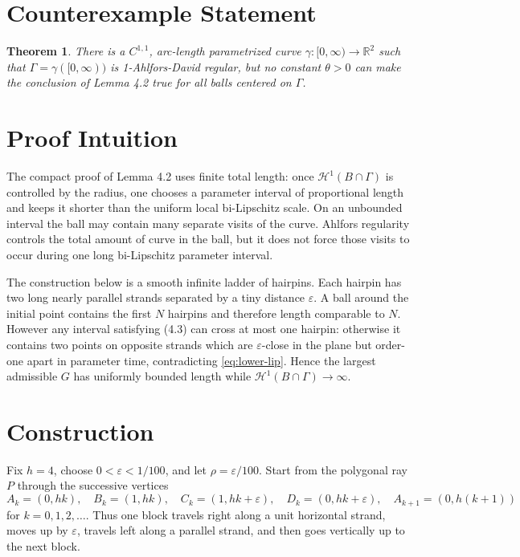 \documentclass[11pt]{article}
\newtheorem{theorem}{Theorem}
\newcommand{\HH}{\mathcal H}
\newcommand{\R}{\mathbb R}
\begin{document}
\section*{Counterexample Statement}

\begin{theorem}
There is a \(C^{1,1}\), arc-length parametrized curve
\(\gamma:[0,\infty)\to\R^2\) such that \(\Gamma=\gamma([0,\infty))\) is
1-Ahlfors-David regular, but no constant \(\theta>0\) can make the conclusion
of Lemma 4.2 true for all balls centered on \(\Gamma\).
\end{theorem}

\section*{Proof Intuition}

The compact proof of Lemma 4.2 uses finite total length: once
\(\HH^1(B\cap\Gamma)\) is controlled by the radius, one chooses a parameter
interval of proportional length and keeps it shorter than the uniform local
bi-Lipschitz scale.  On an unbounded interval the ball may contain many
separate visits of the curve.  Ahlfors regularity controls the total amount of
curve in the ball, but it does not force those visits to occur during one long
bi-Lipschitz parameter interval.

The construction below is a smooth infinite ladder of hairpins.  Each hairpin
has two long nearly parallel strands separated by a tiny distance
\(\varepsilon\).  A ball around the initial point contains the first \(N\)
hairpins and therefore length comparable to \(N\).  However any interval
satisfying (4.3) can cross at most one hairpin: otherwise it contains two
points on opposite strands which are \(\varepsilon\)-close in the plane but
order-one apart in parameter time, contradicting \eqref{eq:lower-lip}.  Hence
the largest admissible \(G\) has uniformly bounded length while
\(\HH^1(B\cap\Gamma)\to\infty\).

\section*{Construction}

Fix \(h=4\), choose \(0<\varepsilon<1/100\), and let
\(\rho=\varepsilon/100\).  Start from the polygonal ray \(P\) through the
successive vertices
\[
  A_k=(0,hk),\quad
  B_k=(1,hk),\quad
  C_k=(1,hk+\varepsilon),\quad
  D_k=(0,hk+\varepsilon),\quad
  A_{k+1}=(0,h(k+1))
\]
for \(k=0,1,2,\ldots\).  Thus one block travels right along a unit horizontal
strand, moves up by \(\varepsilon\), travels left along a parallel strand, and
then goes vertically up to the next block.
\end{document}
